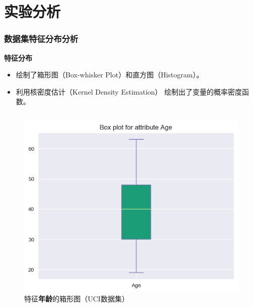 \documentclass[10pt,aspectratio=43,mathserif]{beamer}
\begin{document}
\section[实验]{实验分析}

		\begin{frame}
		  \frametitle{\textbf{数据集特征分布分析}}
		  \begin{block}{\textbf{特征分布}}
                \begin{itemize}
                    \item 绘制了箱形图（Box-whisker Plot）和直方图（Histogram）。
                    \item 利用核密度估计（Kernel Density Estimation）
                    绘制出了变量的概率密度函数。
                \end{itemize}
            \end{block}
            \begin{columns}
                \begin{figure}
                    \centering
                    \includegraphics[width=1\textwidth]{figures/age.png}
                    \caption{特征\textbf{年龄}的箱形图（UCI数据集）}
                \end{figure}


\end{columns}
\end{frame}
\end{document}
